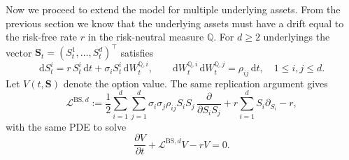 \documentclass[12pt]{report} %
\theoremstyle{plain}           %
\theoremstyle{definition}      %
\theoremstyle{remark}          %
\begin{document}
Now we proceed to extend the model for multiple underlying assets. From the previous section we know that the underlying assets
must have a drift equal to the risk-free rate $r$ in the risk-neutral measure $\mathbb{Q}$. For $d\ge2$ underlyings the vector
$\mathbf{S}_t=(S^1_t,\dots,S^d_t)^{\!\top}$ satisfies
\begin{equation}\label{eq:gbm_multi_redux}
  \mathrm{d}S^i_t
  = r\,S^i_t\,\mathrm{d}t
  + \sigma_i S^i_t\,\mathrm{d}W^{\mathbb{Q},i}_t,
  \qquad
  \mathrm{d}W^{\mathbb{Q},i}_t\,\mathrm{d}W^{\mathbb{Q},j}_t
  = \rho_{ij}\,\mathrm{d}t,
  \quad 1\le i,j\le d.
\end{equation}
Let $V(t,\mathbf{S})$ denote the option value. The same replication argument gives
\begin{equation}\label{eq:L_multi}
  \mathcal{L}^{\mathrm{BS},d}
  := \frac12\sum_{i=1}^d\sum_{j=1}^{d}
        \sigma_i\sigma_j\rho_{ij}
        S_iS_j\,\frac{\partial }{\partial S_i S_j}
     + r\sum_{i=1}^{d}S_i\partial_{S_i}
     - r,
\end{equation}
with the same PDE to solve 
\begin{equation}
	\frac{\partial V}{\partial t} + \mathcal{L}^{\mathrm{BS},d}V - rV=0.
\end{equation}
\end{document}
